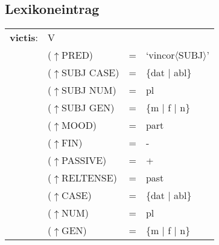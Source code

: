 \documentclass[12pt,a4paper]{article}
\begin{document}
\subsection{Lexikoneintrag}
\begin{singlespace}
\begin{tabular}{ l  l  l  l  } 
\textbf{victis}: & \: V \\
$\qquad$ & \:  ($\uparrow$PRED) & = & `vincor$\langle$SUBJ$\rangle$'\\
$\qquad$ & \: ($\uparrow$SUBJ CASE) & = & \{dat $\mid$ abl\} \\
$\qquad$ & \:  ($\uparrow$SUBJ NUM) & = & pl \\
$\qquad$ & \: ($\uparrow$SUBJ GEN) & = & \{m $\mid$ f $\mid$ n\} \\
$\qquad$ & \:  ($\uparrow$MOOD) & = & part\\
$\qquad$ & \:  ($\uparrow$FIN) & = & - \\
$\qquad$ & \: ($\uparrow$PASSIVE) & = & + \\
$\qquad$ & \: ($\uparrow$RELTENSE) & = & past \\
$\qquad$ & \: ($\uparrow$CASE) & = & \{dat $\mid$ abl\} \\
$\qquad$ & \:  ($\uparrow$NUM) & = & pl \\
$\qquad$ & \: ($\uparrow$GEN) & = & \{m $\mid$ f $\mid$ n\} \\
\end{tabular}
\end{singlespace}
\end{document}
